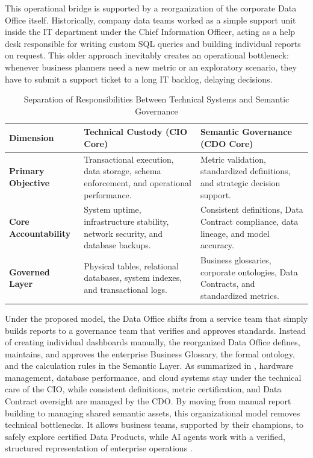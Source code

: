 This operational bridge is supported by a reorganization of the corporate Data Office itself. 
Historically, company data teams worked as a simple support unit inside the IT department under the Chief Information Officer, acting as a help desk responsible 
for writing custom SQL queries and building individual reports on request. 
This older approach inevitably creates an operational bottleneck: whenever business planners need a new metric or an exploratory scenario, 
they have to submit a support ticket to a long IT backlog, delaying decisions.

\begin{table}[t]
\centering
\small
\caption{Separation of Responsibilities Between Technical Systems and Semantic Governance}
\label{tab:governance_responsibilities}
\begin{tabular}{p{3.2cm} p{5.5cm} p{5.5cm}}
\hline
\textbf{Dimension} & \textbf{Technical Custody (CIO Core)} & \textbf{Semantic Governance (CDO Core)} \\ \hline
\textbf{Primary Objective} & Transactional execution, data storage, schema enforcement, and operational performance. & Metric validation, standardized definitions, and strategic decision support. \\ 
\textbf{Core Accountability} & System uptime, infrastructure stability, network security, and database backups. & Consistent definitions, Data Contract compliance, data lineage, and model accuracy. \\ 
\textbf{Governed Layer} & Physical tables, relational databases, system indexes, and transactional logs. & Business glossaries, corporate ontologies, Data Contracts, and standardized metrics. \\ \hline
\end{tabular}
\end{table}

Under the proposed model, the Data Office shifts from a service team that simply builds reports to a governance team that verifies and approves standards. 
Instead of creating individual dashboards manually, the reorganized Data Office defines, maintains, and approves the enterprise Business Glossary, the formal ontology, 
and the calculation rules in the Semantic Layer. 
As summarized in , hardware management, database performance, and cloud systems stay under the technical care of the CIO, 
while consistent definitions, metric certification, and Data Contract oversight are managed by the CDO. 
By moving from manual report building to managing shared semantic assets, this organizational model removes technical bottlenecks. 
It allows business teams, supported by their champions, to safely explore certified Data Products, while AI agents work with a verified, structured representation of 
enterprise operations \cite{davenport2017competing, dehghani2022data}.